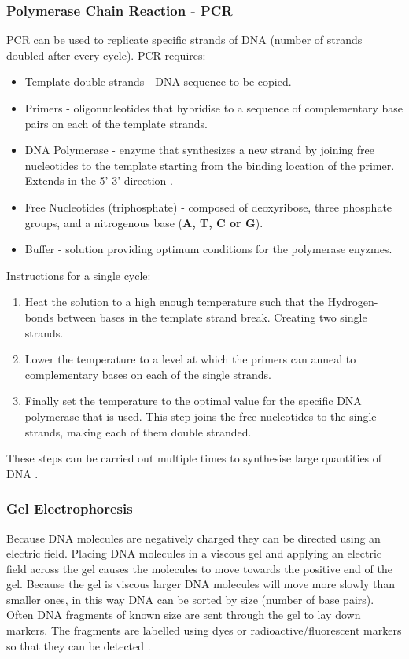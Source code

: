 \documentclass[11pt,a4paper,portrait]{article}
\begin{document}
\subsubsection{Polymerase Chain Reaction - PCR}
PCR can be used to replicate specific strands of DNA (number of strands doubled after every cycle). PCR requires:
\begin{itemize}
   \item Template double strands - DNA sequence to be copied.
   \item Primers - oligonucleotides that hybridise to a sequence of complementary base pairs on each of the template strands.
   \item DNA Polymerase - enzyme that synthesizes a new strand by joining free nucleotides to the template starting from the binding location of the primer. Extends in the 5'-3' direction \cite{paun2013DNA}.
   \item Free Nucleotides (triphosphate) - composed of deoxyribose, three phosphate groups, and a nitrogenous base (\textbf{A, T, C or G}).
   \item Buffer - solution providing optimum conditions for the polymerase enyzmes. 
\end{itemize}

Instructions for a single cycle:
\begin{enumerate}
\item Heat the solution to a high enough temperature such that the Hydrogen-bonds between bases in the template strand break. Creating two single strands.
\item Lower the temperature to a level at which the primers can anneal to complementary bases on each of the single strands.
\item Finally set the temperature to the optimal value for the specific DNA polymerase that is used. This step joins the free nucleotides to the single strands, making each of them double stranded.
\end{enumerate}

These steps can be carried out multiple times to synthesise large quantities of DNA \cite{PCR}.

\subsubsection{Gel Electrophoresis}
Because DNA molecules are negatively charged they can be directed using an electric field. Placing DNA molecules in a viscous gel and applying an electric field across the gel causes the molecules to move towards the positive end of the gel. Because the gel is viscous larger DNA molecules will move more slowly than smaller ones, in this way DNA can be sorted by size (number of base pairs). Often DNA fragments of known size are sent through the gel to lay down markers. The fragments are labelled using dyes or radioactive/fluorescent markers so that they can be detected \cite{dna}.
\end{document}
